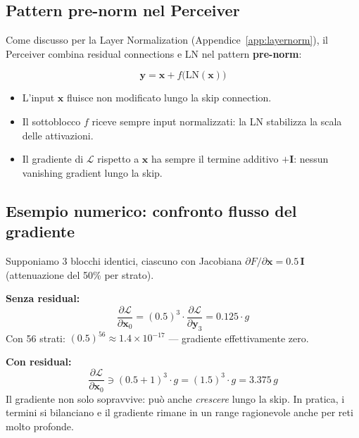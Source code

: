 \documentclass[
  11pt,
]{article}
\begin{document}
\subsection{Pattern pre-norm nel Perceiver}

Come discusso per la Layer Normalization (Appendice~\ref{app:layernorm}), il Perceiver combina residual connections e LN nel pattern \textbf{pre-norm}:

\begin{formulabox}[title={\textbf{Blocco residuale con pre-norm}}]
\[
\mathbf{y} = \mathbf{x} + f\!\bigl(\text{LN}(\mathbf{x})\bigr)
\]
\end{formulabox}

\begin{itemize}
  \item L'input $\mathbf{x}$ fluisce non modificato lungo la skip connection.
  \item Il sottoblocco $f$ riceve sempre input normalizzati: la LN stabilizza la scala delle attivazioni.
  \item Il gradiente di $\mathcal{L}$ rispetto a $\mathbf{x}$ ha sempre il termine additivo $+\mathbf{I}$: nessun vanishing gradient lungo la skip.
\end{itemize}

\subsection{Esempio numerico: confronto flusso del gradiente}

\begin{notabox}[title={\textbf{Esempio: 3 strati, gradiente senza e con residual}}]
Supponiamo 3 blocchi identici, ciascuno con Jacobiana $\partial F / \partial \mathbf{x} = 0.5\,\mathbf{I}$ (attenuazione del 50\% per strato).

\textbf{Senza residual:}
\[
\frac{\partial \mathcal{L}}{\partial \mathbf{x}_0} = (0.5)^3 \cdot \frac{\partial \mathcal{L}}{\partial \mathbf{y}_3} = 0.125 \cdot g
\]
Con 56 strati: $(0.5)^{56} \approx 1.4 \times 10^{-17}$ --- gradiente effettivamente zero.

\textbf{Con residual:}
\[
\frac{\partial \mathcal{L}}{\partial \mathbf{x}_0} \ni (0.5 + 1)^3 \cdot g = (1.5)^3 \cdot g = 3.375\,g
\]
Il gradiente non solo sopravvive: può anche \emph{crescere} lungo la skip. In pratica, i termini si bilanciano e il gradiente rimane in un range ragionevole anche per reti molto profonde.
\end{notabox}
\end{document}
